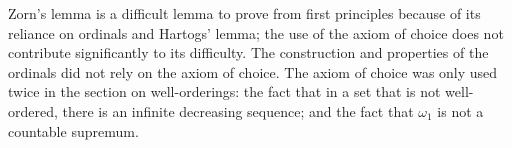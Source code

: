 Zorn's lemma is a difficult lemma to prove from first principles because of its reliance on ordinals and Hartogs' lemma; the use of the axiom of choice does not contribute significantly to its difficulty.
The construction and properties of the ordinals did not rely on the axiom of choice.
The axiom of choice was only used twice in the section on well-orderings: the fact that in a set that is not well-ordered, there is an infinite decreasing sequence; and the fact that \( \omega_1 \) is not a countable supremum.
